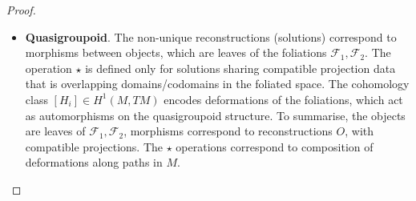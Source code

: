 \documentclass[10pt,a4paper]{amsart}
\newcommand{\cF}{\mathcal{F}}
\begin{document}
\begin{proof}
\begin{itemize}
\begin{itemize}
\item \textbf{Quasigroupoid}.  The non-unique reconstructions (solutions) correspond to morphisms between objects, which are leaves of the foliations $\cF_1, \cF_2$.
The operation $\star$  is defined only for solutions sharing compatible projection data that is overlapping domains/codomains in the foliated space. The cohomology class $[H_i] \in H^1(M, TM)$ encodes deformations of the foliations, which act as automorphisms on the quasigroupoid structure. To summarise, the objects are leaves of $\cF_1, \cF_2$, morphisms correspond to reconstructions $O$, with compatible projections. The $\star$ operations correspond to composition of deformations along paths in $M$.
\end{itemize}
\end{itemize}
\end{proof}
\end{document}
